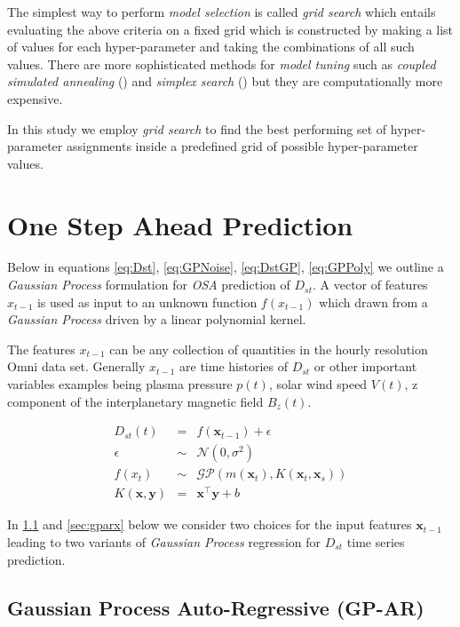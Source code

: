 \documentclass[referee,a4paper,12pt,traditabstract]{swsc}
\begin{document}
\begin{linenumbers}
The simplest way to perform \emph{model selection} is called \emph{grid search} which entails evaluating the above criteria on a fixed grid which is constructed by making a list of values for each hyper-parameter and taking the combinations of all such values. There are more sophisticated methods for \emph{model tuning} such as \emph{coupled simulated annealing} (\citet{Xavier-De-Souza2010}) and \emph{simplex search} (\citet{Nelder1965}) but they are computationally more expensive. 

In this study we employ \emph{grid search} to find the best performing set of hyper-parameter assignments inside a predefined grid of possible hyper-parameter values.


\section{One Step Ahead Prediction} \label{sec:osa}

Below in equations \ref{eq:Dst}, \ref{eq:GPNoise}, \ref{eq:DstGP}, \ref{eq:GPPoly} we outline a \emph{Gaussian Process} formulation for \emph{OSA} prediction of $D_{st}$. A vector of features $x_{t-1}$ is used as input to an unknown function $f(x_{t-1})$ which drawn from a \emph{Gaussian Process} driven by a linear polynomial kernel. 

The features $x_{t-1}$ can be any collection of quantities in the hourly resolution Omni data set. Generally $x_{t-1}$ are time histories of $D_{st}$ or other important variables examples being plasma pressure $p(t)$, solar wind speed $V(t)$, z component of the interplanetary magnetic field $B_z(t)$.

\begin{eqnarray}
    D_{st}(t) & = & f(\mathbf{x}_{t-1}) + \epsilon \label{eq:Dst} \\
    \epsilon & \sim & \mathcal{N}(0, \sigma^2) \label{eq:GPNoise} \\
    f(x_t) & \sim & \mathcal{GP}(m(\mathbf{x}_t), K(\mathbf{x}_t, \mathbf{x}_s)) \label{eq:DstGP} \\
    K(\mathbf{x}, \mathbf{y}) & = & \mathbf{x}^\intercal \mathbf{y} + b \label{eq:GPPoly}
\end{eqnarray}

In \ref{sec:gpar} and \ref{sec:gparx} below we consider two choices for the input features $\mathbf{x}_{t-1}$ leading to two variants of \emph{Gaussian Process} regression for $D_{st}$ time series prediction.

\subsection{Gaussian Process Auto-Regressive (GP-AR)} \label{sec:gpar}


\end{linenumbers}
\end{document}
